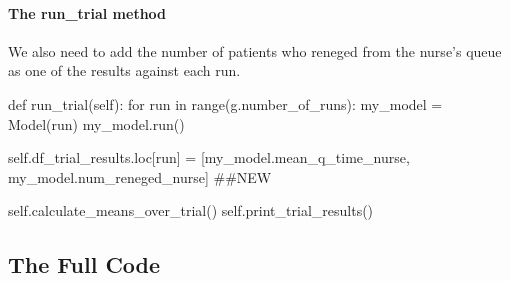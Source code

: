 \documentclass[
  letterpaper,
  DIV=11,
  numbers=noendperiod]{scrreprt}
\let\oldparagraph\paragraph
\renewcommand{\paragraph}[1]{\oldparagraph{#1}\mbox{}}
\newenvironment{Shaded}{}{}
\newcommand{\BuiltInTok}[1]{\textcolor[rgb]{0.84,0.23,0.29}{#1}}
\newcommand{\CommentTok}[1]{\textcolor[rgb]{0.42,0.45,0.49}{#1}}
\newcommand{\ControlFlowTok}[1]{\textcolor[rgb]{0.84,0.23,0.29}{#1}}
\newcommand{\KeywordTok}[1]{\textcolor[rgb]{0.84,0.23,0.29}{#1}}
\newcommand{\NormalTok}[1]{\textcolor[rgb]{0.14,0.16,0.18}{#1}}
\newcommand{\OperatorTok}[1]{\textcolor[rgb]{0.14,0.16,0.18}{#1}}
\newcommand{\VariableTok}[1]{\textcolor[rgb]{0.89,0.38,0.04}{#1}}
\begin{document}
\paragraph{The run\_trial method}\label{the-run_trial-method-1}

We also need to add the number of patients who reneged from the nurse's
queue as one of the results against each run.

\begin{Shaded}
\begin{Highlighting}[]
\KeywordTok{def}\NormalTok{ run\_trial(}\VariableTok{self}\NormalTok{):}
    \ControlFlowTok{for}\NormalTok{ run }\KeywordTok{in} \BuiltInTok{range}\NormalTok{(g.number\_of\_runs):}
\NormalTok{        my\_model }\OperatorTok{=}\NormalTok{ Model(run)}
\NormalTok{        my\_model.run()}


        \VariableTok{self}\NormalTok{.df\_trial\_results.loc[run] }\OperatorTok{=}\NormalTok{ [my\_model.mean\_q\_time\_nurse,}
\NormalTok{                                            my\_model.num\_reneged\_nurse] }\CommentTok{\#\#NEW}

    \VariableTok{self}\NormalTok{.calculate\_means\_over\_trial()}
    \VariableTok{self}\NormalTok{.print\_trial\_results()}
\end{Highlighting}
\end{Shaded}

\subsection{The Full Code}\label{the-full-code-4}
\end{document}
